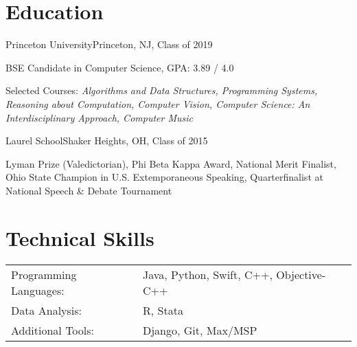 \documentclass[12pt]{my_resume}
\begin{document}
\vspace{-6pt}

\section{Education}

\begin{resitem}{Princeton University}{Princeton, NJ, Class of 2019}
  \item BSE Candidate in Computer Science, GPA: 3.89 / 4.0
  \item Selected Courses: \textit{Algorithms and Data Structures, %
  Programming Systems, Reasoning about Computation, Computer Vision, %
  Computer Science: An Interdisciplinary Approach, Computer Music}
\end{resitem}

\vspace{-8pt}

\begin{resitem}{Laurel School}{Shaker Heights, OH, Class of 2015}
  \item Lyman Prize (Valedictorian), Phi Beta Kappa Award, %
  National Merit Finalist, Ohio State Champion in %
  U.S. Extemporaneous Speaking, Quarterfinalist at National Speech \& %
  Debate Tournament
\end{resitem}

\section{Technical Skills}

\vspace{-6pt}
\begin{tabular}{l l}%
Programming Languages: & Java, Python, Swift, C++, Objective-C++\\
Data Analysis: & R, Stata\\
Additional Tools: & Django, Git, Max/MSP\\
\end{tabular}

\end{document}
